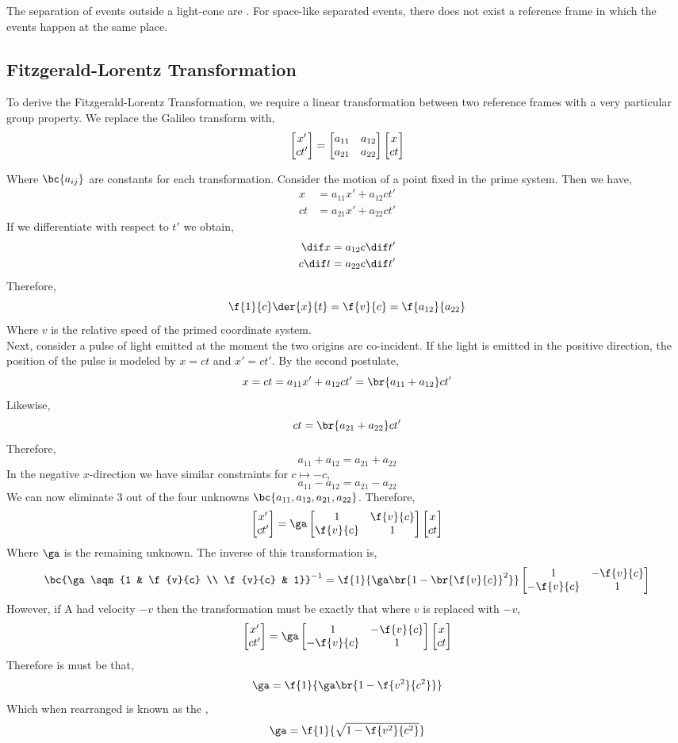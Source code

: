 \documentclass{article}
\begin{document}
The separation of events outside a light-cone are . For space-like separated events, there does not exist a reference frame in which the events happen at the same place.

\subsection{Fitzgerald-Lorentz Transformation}
To derive the Fitzgerald-Lorentz Transformation, we require a linear transformation between two reference frames with a very particular group property. We replace the Galileo transform with,
\[ \begin{bmatrix}x' \\ ct'\end{bmatrix} = \begin{bmatrix}a_{11} & a_{12} \\ a_{21} & a_{22}\end{bmatrix} \begin{bmatrix}x \\ ct\end{bmatrix} \]

Where $\bc{a_{ij}}$ are constants for each transformation. Consider the motion of a point fixed in the prime system. Then we have,
\begin{align*}
x &= a_{11} x' + a_{12} ct' \\
ct &= a_{21} x' + a_{22} ct'
\end{align*}
If we differentiate with respect to $t'$ we obtain,
\begin{align*}
\dif x &= a_{12} c\dif t' \\
c \dif t &= a_{22} c \dif t'
\end{align*}
Therefore,
\[ \f{1}{c} \der{x}{t} = \f{v}{c} = \f{a_{12}}{a_{22}} \]
Where $v$ is the relative speed of the primed coordinate system. \\

Next, consider a pulse of light emitted at the moment the two origins are co-incident. If the light is emitted in the positive direction, the position of the pulse is modeled by $x = ct$ and $x' = ct'$. By the second postulate,
\[ x = ct = a_{11} x' + a_{12} c t' = \br{a_{11} + a_{12}} ct' \]
Likewise,
\[ ct = \br{a_{21} + a_{22}}ct' \]
Therefore,
\[ a_{11} + a_{12} = a_{21} + a_{22} \]
In the negative $x$-direction we have similar constraints for $c \mapsto -c$,
\[ a_{11} - a_{12} = a_{21} - a_{22} \]
We can now eliminate $3$ out of the four unknowns $\bc{a_{11}, a_{12}, a_{21}, a_{22}}$. Therefore,
\[ \sqm{x' \\ ct'} = \ga\sqm{1 & \f{v}{c} \\ \f{v}{c} & 1}\sqm{x \\ ct} \]
Where $\ga$ is the remaining unknown. The inverse of this transformation is,
\[ \bc{\ga\sqm{1 & \f{v}{c} \\  \f{v}{c} & 1}}^{-1} = \f{1}{\ga\br{1 - \br{\f{v}{c}}^2}}\sqm{1 & -\f{v}{c} \\ -\f{v}{c} & 1} \]
However, if \p A had velocity $-v$ then the transformation must be exactly that where $v$ is replaced with $-v$,
\[ \sqm{x' \\ ct'}=\ga\sqm{1 & -\f{v}{c} \\ -\f{v}{c} & 1}\sqm{x \\ ct} \]
Therefore is must be that,
\[ \ga = \f{1}{\ga\br{1 - \f{v^2}{c^2}}} \]
Which when rearranged is known as the ,
\[ \ga = \f{1}{\sqrt{1 - \f{v^2}{c^2}}} \]
\end{document}
